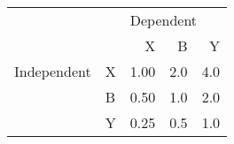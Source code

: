 \begin{tabular}{llrrr}
\toprule
            &   & \multicolumn{3}{l}{Dependent} \\
            &   &         X &    B &    Y \\
\midrule
Independent & X &      1.00 &  2.0 &  4.0 \\
            & B &      0.50 &  1.0 &  2.0 \\
            & Y &      0.25 &  0.5 &  1.0 \\
\bottomrule
\end{tabular}
